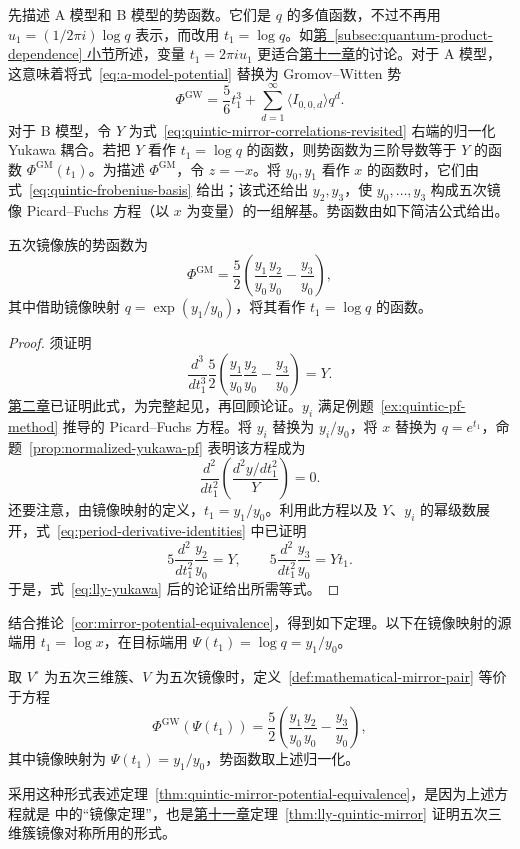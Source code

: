先描述 A 模型和 B 模型的势函数。它们是 $q$ 的多值函数，不过不再用 $u_1=(1/2\pi i)\log q$ 表示，而改用 $t_1=\log q$。如\hyperref[subsec:quantum-product-dependence]{第~\ref*{subsec:quantum-product-dependence} 小节}所述，变量
$t_1=2\pi iu_1$ 更适合\hyperref[chap:mirror-theorem]{第十一章}的讨论。对于 A 模型，这意味着将式~\eqref{eq:a-model-potential} 替换为 Gromov--Witten 势
\[
\Phi^{\mathrm{GW}}=\frac56t_1^3+\sum_{d=1}^\infty\langle I_{0,0,d}\rangle q^d.
\]
对于 B 模型，令 $Y$ 为式~\eqref{eq:quintic-mirror-correlations-revisited} 右端的归一化 Yukawa 耦合。若把 $Y$ 看作 $t_1=\log q$ 的函数，则势函数为三阶导数等于 $Y$ 的函数 $\Phi^{\mathrm{GM}}(t_1)$。为描述 $\Phi^{\mathrm{GM}}$，令 $z=-x$。将 $y_0,y_1$ 看作 $x$ 的函数时，它们由式~\eqref{eq:quintic-frobenius-basis} 给出；该式还给出 $y_2,y_3$，使 $y_0,\ldots,y_3$ 构成五次镜像 Picard--Fuchs 方程（以 $x$ 为变量）的一组解基。势函数由如下简洁公式给出。
\begin{proposition}\label{prop:quintic-mirror-potential}
五次镜像族的势函数为
\[
\Phi^{\mathrm{GM}}=\frac52\left(\frac{y_1}{y_0}\frac{y_2}{y_0}-\frac{y_3}{y_0}\right),
\]
其中借助镜像映射 $q=\exp(y_1/y_0)$，将其看作 $t_1=\log q$ 的函数。
\end{proposition}
\begin{proof}
须证明
\[
\frac{d^3}{dt_1^3}\frac52\left(\frac{y_1}{y_0}\frac{y_2}{y_0}-\frac{y_3}{y_0}\right)=Y.
\]
\hyperref[chap:quintic]{第二章}已证明此式，为完整起见，再回顾论证。$y_i$ 满足例题~\ref{ex:quintic-pf-method} 推导的 Picard--Fuchs 方程。将 $y_i$ 替换为 $y_i/y_0$，将 $x$ 替换为 $q=e^{t_1}$，命题~\ref{prop:normalized-yukawa-pf} 表明该方程成为
\[
\frac{d^2}{dt_1^2}\left(\frac{d^2y/dt_1^2}{Y}\right)=0.
\]
还要注意，由镜像映射的定义，$t_1=y_1/y_0$。利用此方程以及 $Y$、$y_i$ 的幂级数展开，式~\eqref{eq:period-derivative-identities} 中已证明
\[
5\frac{d^2}{dt_1^2}\frac{y_2}{y_0}=Y,\qquad
5\frac{d^2}{dt_1^2}\frac{y_3}{y_0}=Yt_1.
\]
于是，式~\eqref{eq:lly-yukawa} 后的论证给出所需等式。
\end{proof}
结合推论~\ref{cor:mirror-potential-equivalence}，得到如下定理。以下在镜像映射的源端用 $t_1=\log x$，在目标端用 $\Psi(t_1)=\log q=y_1/y_0$。
\begin{theorem}\label{thm:quintic-mirror-potential-equivalence}
取 $V^\circ$ 为五次三维簇、$V$ 为五次镜像时，定义~\ref{def:mathematical-mirror-pair} 等价于方程
\[
\Phi^{\mathrm{GW}}(\Psi(t_1))=\frac52\left(\frac{y_1}{y_0}\frac{y_2}{y_0}-\frac{y_3}{y_0}\right),
\]
其中镜像映射为 $\Psi(t_1)=y_1/y_0$，势函数取上述归一化。
\end{theorem}
采用这种形式表述定理~\ref{thm:quintic-mirror-potential-equivalence}，是因为上述方程就是  中的“镜像定理”，也是\hyperref[chap:mirror-theorem]{第十一章}定理~\ref{thm:lly-quintic-mirror} 证明五次三维簇镜像对称所用的形式。

